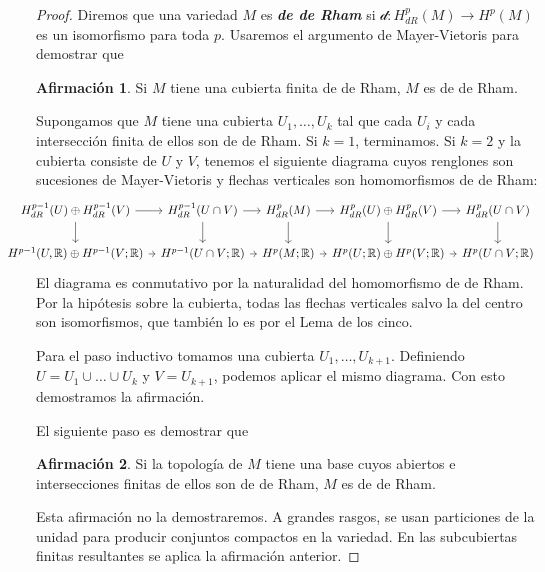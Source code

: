 \documentclass[spanish]{article}
\theoremstyle{definition}
\newtheorem{af}{Afirmación}
\newcommand{\R}{\mathbb{R}}
\begin{document}
\begin{proof}
		Diremos que una variedad $M$ es \textbf{\textit{de de Rham}} si $\mathcal{d}:H^p_{dR}(M)\to H^p(M)$ es un isomorfismo para toda $p$. Usaremos el argumento de Mayer-Vietoris para demostrar que
			\begin{af}
			Si $M$ tiene una cubierta finita de de Rham, $M$ es de de Rham.
		\end{af}
		Supongamos que $M$ tiene una cubierta $U_1,\ldots,U_k$ tal que cada $U_i$ y cada intersección finita de ellos son de de Rham. Si $k=1$, terminamos. Si $k=2$ y la cubierta consiste de $U$ y $V$, tenemos el siguiente diagrama cuyos renglones son sucesiones de Mayer-Vietoris y flechas verticales son homomorfismos de de Rham:
		\[\hspace{-1cm}\begin{tikzcd}[column sep=tiny]
			H_{dR}^{p-1}(U)\oplus H_{dR}^{p-1}(V)\arrow[r]\arrow[d]&H_{dR}^{p-1}(U\cap V)\arrow[d]\arrow[r]&H^p_{dR}(M)\arrow[d]\arrow[r]&H_{dR}^p(U)\oplus H_{dR}^p(V)\arrow[d]\arrow[r]&H^p_{dR}(U\cap V)\arrow[d]\\
			H^{p-1}(U,\R)\oplus H^{p-1}(V;\R)\arrow[r]&H^{p-1}(U\cap V;\R)\arrow[r]&H^p(M;\R)\arrow[r]&H^p(U;\R)\oplus H^p(V;\R)\arrow[r]&H^p(U\cap V;\R)
		\end{tikzcd}\]
		El diagrama es conmutativo por la naturalidad del homomorfismo de de Rham. Por la hipótesis sobre la cubierta, todas las flechas verticales salvo la del centro son isomorfismos, que también lo es por el Lema de los cinco.
		
		Para el paso inductivo tomamos una cubierta $U_1,\ldots,U_{k+1}$. Definiendo $U=U_1\cup \ldots\cup U_k$ y $V=U_{k+1}$, podemos aplicar el mismo diagrama. Con esto demostramos la afirmación.
		
		El siguiente paso es demostrar que
		
		\begin{af}
			Si la topología de $M$ tiene una base cuyos abiertos e intersecciones finitas de ellos son de de Rham, $M$ es de de Rham.
		\end{af}
		Esta afirmación no la demostraremos. A grandes rasgos, se usan particiones de la unidad para producir conjuntos compactos en la variedad. En las subcubiertas finitas resultantes se aplica la afirmación anterior.
		

\end{proof}
\end{document}
